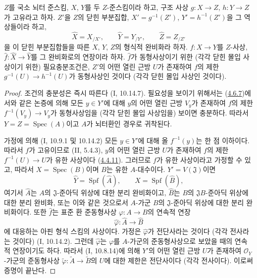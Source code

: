 \begin{proposition}[4.6.8]
\label{III.4.6.8-fr}
$Z$를 국소 뇌터 준스킴, $X$, $Y$를 두 $Z$-준스킴이라 하고, 구조
사상 $g:X\to Z$, $h:Y\to Z$가 고유라고 하자. $Z'$을 $Z$의 닫힌
부분집합, $X'=g^{-1}(Z')$, $Y'=h^{-1}(Z')$을 그 역상들이라 하고,
\[
\widehat X=X_{/X'},\qquad
\widehat Y=Y_{/Y'},\qquad
\widehat Z=Z_{/Z'}
\]
을 이 닫힌 부분집합들을 따른 $X$, $Y$, $Z$의 형식적 완비화라
하자. $f:X\to Y$를 $Z$-사상,
$\widehat f:\widehat X\to\widehat Y$를 그 완비화로의 연장이라
하자. $\widehat f$가 동형사상이기 위한 (각각 닫힌 몰입 사상이기
위한) 필요충분조건은, $Z'$의 어떤 열린 근방 $U$가 존재하여 $f$의
제한 $g^{-1}(U)\to h^{-1}(U)$가 동형사상인 것이다
(각각 닫힌 몰입 사상인 것이다).
\end{proposition}

\begin{proof}
조건의 충분성은 즉시 따른다 (I, 10.14.7). 필요성을 보이기
위해서는 (\hyperref[III.4.6.7-fr]{4.6.7})에서와 같은 논증에 의해
모든 $y\in Y'$에 대해 $y$의 어떤 열린 근방 $V_y$가 존재하여
$f$의 제한 $f^{-1}(V_y)\to V_y$가 동형사상임을 (각각 닫힌 몰입
사상임을) 보이면 충분하다. 따라서 $Y=Z=\operatorname{Spec}(A)$이고
$A$가 뇌터환인 경우로 귀착된다.

가정에 의해 (I, 10.9.1 및 10.14.2) 모든 $y\in Y'$에 대해 올
$f^{-1}(y)$는 한 점 이하이다. 따라서 $f$가 고유이므로
(II, 5.4.3), $y$의 어떤 열린 근방 $U$가 존재하여 $f$의 제한
$f^{-1}(U)\to U$가 유한 사상이다
(\hyperref[III.4.4.11-fr]{4.4.11}). 그러므로 $f$가 유한
사상이라고 가정할 수 있고, 따라서 $X=\operatorname{Spec}(B)$이며
$B$는 유한 $A$-대수이다. $Y'=V(\mathfrak J)$이면
\[
\widehat Y=\operatorname{Spf}(\widehat A),\qquad
\widehat X=\operatorname{Spf}(\widehat B),
\]
여기서 $\widehat A$는 $A$의 $\mathfrak J$-준아딕 위상에 대한
분리 완비화이고, $\widehat B$는 $B$의 $\mathfrak JB$-준아딕
위상에 대한 분리 완비화, 또는 이와 같은 것으로서 $A$-가군 $B$의
$\mathfrak J$-준아딕 위상에 대한 분리 완비화이다. 또한
$\widehat f$는 표준 환 준동형사상 $\varphi:A\to B$의 연속적 연장
\[
\widehat\varphi:\widehat A\longrightarrow\widehat B
\]
에 대응하는 아핀 형식 스킴의 사상이다. 가정은
$\widehat\varphi$가 전단사라는 것이다 (각각 전사라는 것이다)
(I, 10.14.2). 그런데 $\widehat\varphi$는 $\varphi$를
$A$-가군의 준동형사상으로 보았을 때의 연속적 연장이기도 하다.
따라서 (I, 10.8.14)에 의해 $Y'$의 어떤 열린 근방 $U$가 존재하여
$\mathcal O_Y$-가군의 준동형사상
$\widetilde\varphi:\widetilde A\to\widetilde B$의 $U$에 대한
제한은 전단사이다 (각각 전사이다). 이로써 증명이 끝난다.
\end{proof}

